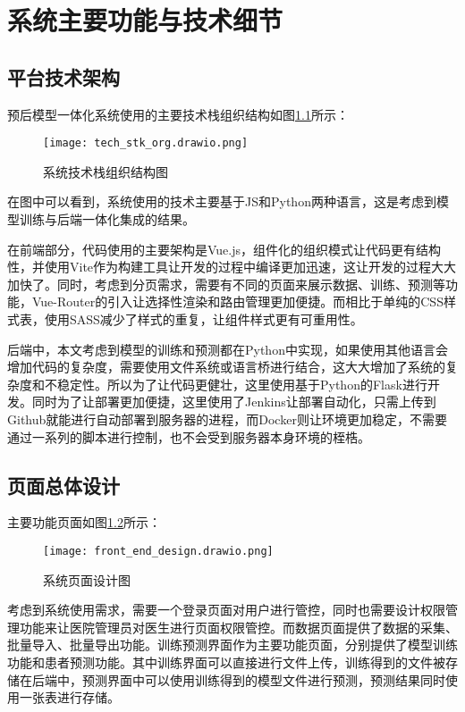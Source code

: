 \chapter{系统主要功能与技术细节}
\label{cha:sys}

\section{平台技术架构}

预后模型一体化系统使用的主要技术栈组织结构如图\ref{fig:tech_stk_org}所示：

\begin{figure}[!htbp]
    \centering
    \texttt{[image: tech\_stk\_org.drawio.png]}
    \caption{系统技术栈组织结构图} \label{fig:tech_stk_org}
\end{figure}

在图中可以看到，系统使用的技术主要基于JS和Python两种语言，这是考虑到模型训练与后端一体化集成的结果。

在前端部分，代码使用的主要架构是Vue.js，组件化的组织模式让代码更有结构性，并使用Vite作为构建工具让开发的过程中编译更加迅速，这让开发的过程大大加快了。同时，考虑到分页需求，需要有不同的页面来展示数据、训练、预测等功能，Vue-Router的引入让选择性渲染和路由管理更加便捷。而相比于单纯的CSS样式表，使用SASS减少了样式的重复，让组件样式更有可重用性。

后端中，本文考虑到模型的训练和预测都在Python中实现，如果使用其他语言会增加代码的复杂度，需要使用文件系统或语言桥进行结合，这大大增加了系统的复杂度和不稳定性。所以为了让代码更健壮，这里使用基于Python的Flask进行开发。同时为了让部署更加便捷，这里使用了Jenkins让部署自动化，只需上传到Github就能进行自动部署到服务器的进程，而Docker则让环境更加稳定，不需要通过一系列的脚本进行控制，也不会受到服务器本身环境的桎梏。

\section{页面总体设计}

主要功能页面如图\ref{fig:pages_design}所示：

\begin{figure}[!htbp]
    \centering
    \texttt{[image: front\_end\_design.drawio.png]}
    \caption{系统页面设计图} \label{fig:pages_design}
\end{figure}

考虑到系统使用需求，需要一个登录页面对用户进行管控，同时也需要设计权限管理功能来让医院管理员对医生进行页面权限管控。而数据页面提供了数据的采集、批量导入、批量导出功能。训练预测界面作为主要功能页面，分别提供了模型训练功能和患者预测功能。其中训练界面可以直接进行文件上传，训练得到的文件被存储在后端中，预测界面中可以使用训练得到的模型文件进行预测，预测结果同时使用一张表进行存储。

